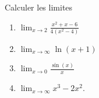 
\begin{exercice}[\boringexo]\label{exorevisions-0004}

	Calculer les limites
	\begin{enumerate}
		\item
			$\displaystyle\lim_{x\to 2} \frac{ x^2+x-6 }{ 4(x^2-4) }$
		\item
			$\lim_{x\to \infty} \ln(x+1)$
		\item
			$\displaystyle\lim_{x\to 0} \frac{ \sin(x) }{ x }$
		\item
			$\lim_{x\to \infty} x^3-2x^2$.
	\end{enumerate}

\end{exercice}

